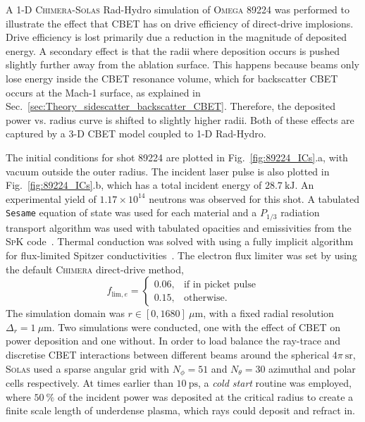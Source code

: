A 1-D \textsc{Chimera}-\textsc{Solas} \ac{Rad-Hydro} simulation of \textsc{Omega} 89224 was performed to illustrate the effect that \ac{CBET} has on drive efficiency of direct-drive implosions.
Drive efficiency is lost primarily due a reduction in the magnitude of deposited energy.
A secondary effect is that the radii where deposition occurs is pushed slightly further away from the ablation surface.
This happens because beams only lose energy inside the \ac{CBET} resonance volume, which for backscatter \ac{CBET} occurs at the Mach-1 surface, as explained in Sec.~\ref{sec:Theory_sidescatter_backscatter_CBET}.
Therefore, the deposited power vs. radius curve is shifted to slightly higher radii.
Both of these effects are captured by a 3-D \ac{CBET} model coupled to 1-D \ac{Rad-Hydro}.

The initial conditions for shot 89224 are plotted in Fig.~\ref{fig:89224_ICs}.a, with vacuum outside the outer radius.
The incident laser pulse is also plotted in Fig.~\ref{fig:89224_ICs}.b, which has a total incident energy of $28.7\  \text{kJ}$.
An experimental yield of $1.17\times 10^{14}$ neutrons was observed for this shot.
A tabulated \texttt{Sesame} equation of state was used for each material \cite{mchardy_introduction_2018} and a $P_{1/3}$ radiation transport algorithm was used with tabulated opacities and emissivities from the \textsc{SpK} code~\cite{crilly_spk_2023}.
Thermal conduction was solved with using a fully implicit algorithm for flux-limited Spitzer conductivities~\cite{spitzer_transport_1953}.
The electron flux limiter was set by using the default \textsc{Chimera} direct-drive method,
\begin{equation}
    \label{eq:SOLAS_flime}
    f_{\text{lim},e} = 
    \begin{cases}
        0.06, & \text{if in picket pulse}\\
        0.15, & \text{otherwise}.
    \end{cases}
\end{equation}
The simulation domain was $r\in [0,1680]\ \mu\text{m}$, with a fixed radial resolution $\Delta_r = 1\ \mu\text{m}$.
Two simulations were conducted, one with the effect of \ac{CBET} on power deposition and one without.
In order to load balance the ray-trace and discretise \ac{CBET} interactions between different beams around the spherical $4\pi\ \text{sr}$, \textsc{Solas} used a sparse angular grid with $N_{\phi}=51$ and $N_{\theta}=30$ azimuthal and polar cells respectively.
At times earlier than $10\ \text{ps}$, a \textit{cold start} routine was employed, where $50\ \%$ of the incident power was deposited at the critical radius to create a finite scale length of underdense plasma, which rays could deposit and refract in.
